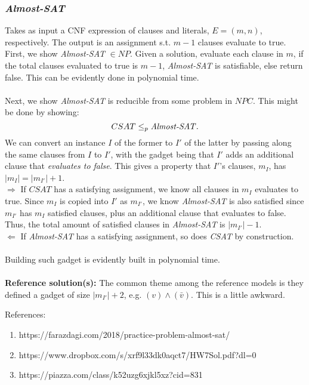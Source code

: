 \documentclass{article}
\theoremstyle{definition}
\begin{document}
\subsubsection{\textit{Almost-SAT}} \label{red:almostsat}
Takes as input a CNF expression of clauses and literals, $E = (m,n)$, respectively. The output is an assignment s.t. $m-1$ clauses evaluate to true.\\
First, we show \textit{Almost-SAT} $\in NP$. Given a solution, evaluate each clause in $m$, if the total clauses evaluated to true is $m-1$, \textit{Almost-SAT} is satisfiable, else return false. This can be evidently done in polynomial time.\\\\
Next, we show \textit{Almost-SAT} is reducible from some problem in $NPC$. This might be done by showing:
$$CSAT \leq_p \text{\textit{Almost-SAT}}.$$
We can convert an instance $I$ of the former to $I'$ of the latter by passing along the same clauses from $I$ to $I'$, with the gadget being that $I'$ adds an additional clause that \textit{evaluates to false}. This gives a property that $I'$'s clauses, $m_I$, has $|m_I| = |m_{I'}|+1$.\\
$\Rightarrow$ If $CSAT$ has a satisfying assignment, we know all clauses in $m_I$ evaluates to true. Since $m_I$ is copied into $I'$ as $m_{I'}$, we know \textit{Almost-SAT} is also satisfied since $m_{I'}$ has $m_{I}$ satisfied clauses, plus an additional clause that evaluates to false. Thus, the total amount of satisfied clauses in \textit{Almost-SAT} is $|m_{I'}|-1$.\\
$\Leftarrow$ If \textit{Almost-SAT} has a satisfying assignment, so does \textit{CSAT} by construction.\\\\
Building such gadget is evidently built in polynomial time.\\\\
\textbf{Reference solution(s):} The common theme among the reference models is they defined a gadget of size $|m_{I'}|+2$, e.g. $(v) \land (\bar{v})$. This is a little awkward.

References:
\begin{enumerate}
	\item https://farazdagi.com/2018/practice-problem-almost-sat/
	\item https://www.dropbox.com/s/xrf9l33dk0aqct7/HW7Sol.pdf?dl=0
	\item https://piazza.com/class/k52uzg6xjkl5xz?cid=831
\end{enumerate}
\end{document}
